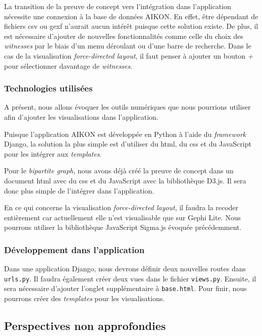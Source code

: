 La transition de la preuve de concept vers l'intégration dans l'application nécessite une connexion à la base de données AIKON.
En effet, être dépendant de fichiers \gls{csv} ou \gls{gexf} n'aurait aucun intérêt puisque cette solution existe. 
De plus, il est nécessaire d'ajouter de nouvelles fonctionnalités comme celle du choix des \textit{witnesses} par le biais d'un menu déroulant ou d'une barre de recherche. Dans le cas de la visualisation \textit{force-directed layout}, il faut penser à ajouter un bouton \textit{+} pour sélectionner davantage de \textit{witnesses}.


\subsubsection{Technologies utilisées}

A présent, nous allons évoquer les outils numériques que nous pourrions utiliser afin d'ajouter les visualisations dans l'application. 

Puisque l'application AIKON est développée en Python à l'aide du \textit{framework} Django, la solution la plus simple est d'utiliser du \gls{html}, du \gls{css} et du JavaScript pour les intégrer aux \textit{templates}.

Pour le \textit{bipartite graph}, nous avons déjà créé la preuve de concept dans un document \gls{html} avec du \gls{css} et du JavaScript avec la bibliothèque D3.js. Il sera donc plus simple de l'intégrer dans l'application.

En ce qui concerne la visualisation \textit{force-directed layout}, il faudra la recoder entièrement car actuellement elle n'est visualisable que sur Gephi Lite. Nous pourrons utiliser la bibliothèque JavaScript Sigma.js évoquée précédemment. 

\subsubsection{Développement dans l'application}

Dans une application Django, nous devrons définir deux nouvelles routes dans \texttt{urls.py}. Il faudra également créer deux vues dans le fichier \texttt{views.py}. Ensuite, il sera nécessaire d'ajouter l'onglet supplémentaire à \texttt{base.html}. Pour finir, nous pourrons créer des \textit{templates} pour les visualisations.



\subsection{Perspectives non approfondies}

